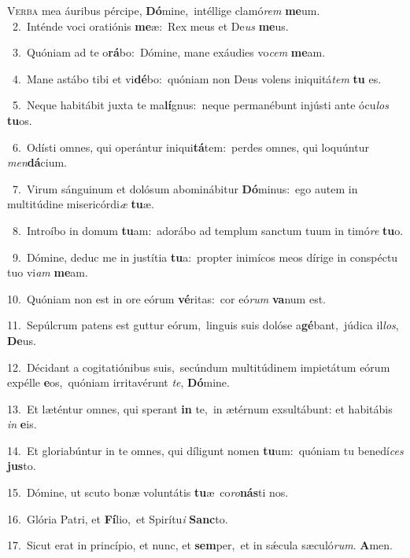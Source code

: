 \lettrine{\initial\textcolor{\initialcolor}{V}}{erba} mea áuribus pércipe, \textbf{Dó}\-mine,~\star intéllige clamó\textit{rem} \textbf{me}\-um.\\
{\numbfont\textcolor{\numbcolor}{~2.}}~Inténde voci oratiónis \textbf{me}\-æ:~\star Rex meus et De\textit{us} \textbf{me}\-us.\par
{\numbfont\textcolor{\numbcolor}{~3.}}~Quóniam ad te o\-\textbf{rá}\-bo:~\star Dómine, mane exáudies vo\textit{cem} \textbf{me}\-am.\par
{\numbfont\textcolor{\numbcolor}{~4.}}~Mane astábo tibi et vi\-\textbf{dé}\-bo:~\star quóniam non Deus volens iniquitá\textit{tem} \textbf{tu} es.\par
{\numbfont\textcolor{\numbcolor}{~5.}}~Neque habitábit juxta te ma\-\textbf{lí}\-gnus:~\star neque permanébunt injústi ante ócu\textit{los} \textbf{tu}\-os.\par
{\numbfont\textcolor{\numbcolor}{~6.}}~Odísti omnes, qui operántur iniqui\-\textbf{tá}\-tem:~\star perdes omnes, qui loquúntur \textit{men}\-\textbf{dá}cium.\par
{\numbfont\textcolor{\numbcolor}{~7.}}~Virum sánguinum et dolósum abominábitur \textbf{Dó}\-minus:~\star ego autem in multitúdine misericórdi\textit{æ} \textbf{tu}\-æ.\par
{\numbfont\textcolor{\numbcolor}{~8.}}~Introíbo in domum \textbf{tu}\-am:~\star adorábo ad templum sanctum tuum in timó\textit{re} \textbf{tu}\-o.\par
{\numbfont\textcolor{\numbcolor}{~9.}}~Dómine, deduc me in justítia \textbf{tu}\-a:~\star propter inimícos meos dírige in conspéctu tuo vi\textit{am} \textbf{me}\-am.\par
{\numbfont\textcolor{\numbcolor}{10.}}~Quóniam non est in ore eórum \textbf{vé}\-ritas:~\star cor eó\textit{rum} \textbf{va}\-num est.\par
{\numbfont\textcolor{\numbcolor}{11.}}~Sepúlcrum patens est guttur eórum,~\dagger linguis suis dolóse a\-\textbf{gé}\-bant,~\star júdica il\-\textit{los}\-, \textbf{De}\-us.\par
{\numbfont\textcolor{\numbcolor}{12.}}~Décidant a cogitatiónibus suis,~\dagger secúndum multitúdinem impietátum eórum expélle \textbf{e}\-os,~\star quóniam irritavérunt \textit{te}\-, \textbf{Dó}\-mine.\par
{\numbfont\textcolor{\numbcolor}{13.}}~Et læténtur omnes, qui sperant \textbf{in} te,~\star in ætérnum exsultábunt: et habitábis \textit{in} \textbf{e}\-is.\par
{\numbfont\textcolor{\numbcolor}{14.}}~Et gloriabúntur in te omnes, qui díligunt nomen \textbf{tu}\-um:~\star quóniam tu benedí\textit{ces} \textbf{jus}\-to.\par
{\numbfont\textcolor{\numbcolor}{15.}}~Dómine, ut scuto bonæ voluntátis \textbf{tu}\-æ~\star co\-\textit{ro}\-\textbf{nás}ti nos.\par
{\numbfont\textcolor{\numbcolor}{16.}}~Glória Patri, et \textbf{Fí}\-lio,~\star et Spirítu\textit{i} \textbf{Sanc}\-to.\par
{\numbfont\textcolor{\numbcolor}{17.}}~Sicut erat in princípio, et nunc, et \textbf{sem}\-per,~\star et in sǽcula sæculó\-\textit{rum}\-. \textbf{A}\-men.\par
